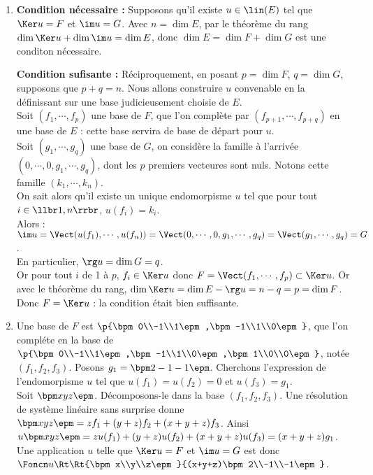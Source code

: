 \begin{enumerate}
\item 
\textbf{Condition nécessaire :} Supposons qu'il existe $u\in\lin(E)$ tel que $\Ker u=F$ et $\im u =G$. Avec $n = \dim E$, par le théorème du rang $\dim\Ker u+\dim\im u=\dim E$, donc $\dim E=\dim F + \dim G$ est une conditon nécessaire. 

\textbf{Condition sufisante :} Réciproquement, en posant $p = \dim F$, $q = \dim G$, supposons que $p+q = n$. Nous allons construire $u$ convenable en la définissant sur une base judicieusement choisie de $E$.\\
Soit $(f_1,\cdots,f_p)$ une base de $F$, que l'on complète par $(f_{p+1}, \cdots,f_{p+q})$ en une base de $E$ : cette base servira de base \og de départ \fg pour $u$.\\
Soit $(g_1,\cdots,g_q)$ une base de $G$, on considère la famille \og à l'arrivée \fg $(0,\cdots,0,g_1,\cdots,g_q)$, dont les $p$ premiers vecteures sont nuls. Notons cette famille $(k_1,\cdots,k_n)$.\\
On sait alors qu'il existe un unique endomorpisme $u$ tel que pour tout $i\in\llbr1,n\rrbr$, $u(f_i)=k_i$.\\
Alors : $\im u=\Vect(u(f_1),\cdots,u(f_n))=\Vect(0,\cdots,0,g_1,\cdots,g_q)=\Vect (g_1,\cdots,g_q)=G$.\\ En particulier, $\rg u=\dim G=q$.\\
Or pour tout $i$ de 1 à $p$, $f_i\in\Ker u$ donc $F=\Vect(f_1,\cdots,f_p)\subset \Ker u$. Or avec le théorème du rang, $\dim\Ker u=\dim E-\rg u=n-q=p=\dim F$. Donc $F=\Ker u$ : la condition était bien suffisante.
\item Une base de $F$ est $\p{\bpm 0\\-1\\1\epm,\bpm -1\\1\\0\epm}$, que l'on compléte en la base de \Rt\ $\p{\bpm 0\\-1\\1\epm,\bpm -1\\1\\0\epm,\bpm 1\\0\\0\epm}$, notée $(f_1,f_2,f_3)$. Posons $g_1=\bpm 2\\-1\\-1\epm$. Cherchons l'expression de l'endomorpisme $u$ tel que $u(f_1)=u(f_2)=0$ et $u(f_3)=g_1$.\\
Soit $\bpm x\\y\\z\epm$. Décomposons-le dans la base $(f_1,f_2,f_3)$. Une résolution de système linéaire sans surprise donne $\bpm x\\y\\z\epm=zf_1+(y+z)f_2+(x+y+z)f_3$. Ainsi $u\bpm x\\y\\z\epm=zu(f_1)+(y+z)u(f_2)+(x+y+z)u(f_3)=(x+y+z)g_1$.\\
Une application $u$ telle que $\Ker u=F$ et $\im u=G$ est donc $\Foncn u\Rt\Rt{\bpm x\\y\\z\epm}{(x+y+z)\bpm 2\\-1\\-1\epm}$.
\end{enumerate}


